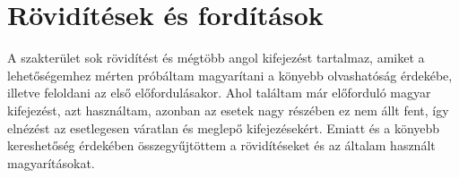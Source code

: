 \chapter*{Rövidítések és fordítások}
\label{sec:abbreviations}

A szakterület sok rövidítést és mégtöbb angol kifejezést tartalmaz, amiket a lehetőségemhez mérten próbáltam magyarítani a könyebb olvashatóság érdekébe, illetve feloldani az első előfordulásakor.
Ahol találtam már előforduló magyar kifejezést, azt használtam, azonban az esetek nagy részében ez nem állt fent, így elnézést az esetlegesen váratlan és meglepő kifejezésekért.
Emiatt és a könyebb kereshetőség érdekében összegyűjtöttem a rövidítéseket és az általam használt magyarításokat.


